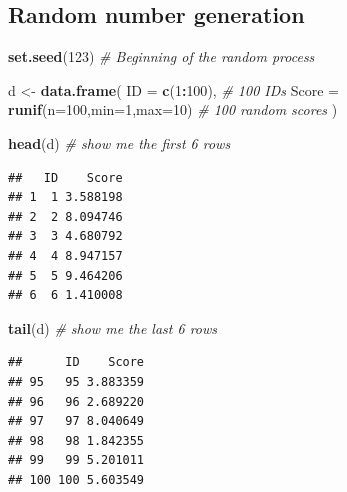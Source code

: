 \documentclass[
]{book}
\newenvironment{Shaded}{\begin{snugshade}}{\end{snugshade}}
\newcommand{\AttributeTok}[1]{\textcolor[rgb]{0.13,0.29,0.53}{#1}}
\newcommand{\CommentTok}[1]{\textcolor[rgb]{0.56,0.35,0.01}{\textit{#1}}}
\newcommand{\DecValTok}[1]{\textcolor[rgb]{0.00,0.00,0.81}{#1}}
\newcommand{\FunctionTok}[1]{\textcolor[rgb]{0.13,0.29,0.53}{\textbf{#1}}}
\newcommand{\NormalTok}[1]{#1}
\newcommand{\OtherTok}[1]{\textcolor[rgb]{0.56,0.35,0.01}{#1}}
\newcommand{\SpecialCharTok}[1]{\textcolor[rgb]{0.81,0.36,0.00}{\textbf{#1}}}
\begin{document}
\subsection*{Random number generation}\label{random-number-generation}

\begin{Shaded}
\begin{Highlighting}[]
\FunctionTok{set.seed}\NormalTok{(}\DecValTok{123}\NormalTok{) }\CommentTok{\# Beginning of the random process}

\NormalTok{d }\OtherTok{\textless{}{-}} \FunctionTok{data.frame}\NormalTok{(}
  \AttributeTok{ID =} \FunctionTok{c}\NormalTok{(}\DecValTok{1}\SpecialCharTok{:}\DecValTok{100}\NormalTok{), }\CommentTok{\# 100 IDs}
  \AttributeTok{Score =} \FunctionTok{runif}\NormalTok{(}\AttributeTok{n=}\DecValTok{100}\NormalTok{,}\AttributeTok{min=}\DecValTok{1}\NormalTok{,}\AttributeTok{max=}\DecValTok{10}\NormalTok{) }\CommentTok{\# 100 random scores}
\NormalTok{)}

\FunctionTok{head}\NormalTok{(d) }\CommentTok{\# show me the first 6 rows}
\end{Highlighting}
\end{Shaded}

\begin{verbatim}
##   ID    Score
## 1  1 3.588198
## 2  2 8.094746
## 3  3 4.680792
## 4  4 8.947157
## 5  5 9.464206
## 6  6 1.410008
\end{verbatim}

\begin{Shaded}
\begin{Highlighting}[]
\FunctionTok{tail}\NormalTok{(d) }\CommentTok{\# show me the last 6 rows}
\end{Highlighting}
\end{Shaded}

\begin{verbatim}
##      ID    Score
## 95   95 3.883359
## 96   96 2.689220
## 97   97 8.040649
## 98   98 1.842355
## 99   99 5.201011
## 100 100 5.603549
\end{verbatim}
\end{document}
